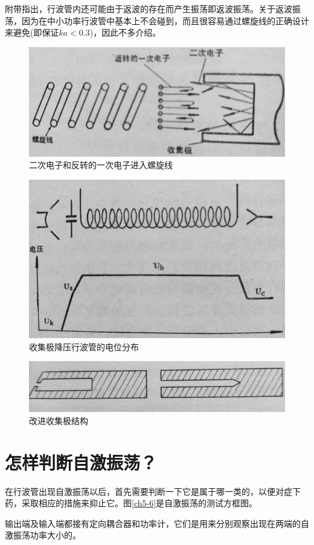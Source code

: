 附带指出，行波管内还可能由于返波的存在而产生振荡即返波振荡。关于返波振荡，因为在中小功率行波管中基本上不会碰到，而且很容易通过螺旋线的正确设计来避免(即保证$ ka < 0.3 $)，因此不多介绍。


\begin{figure}[phtb]
	\centering
	\includegraphics[width=0.65\linewidth]{figure/ch5-3}
	\caption{二次电子和反转的一次电子进入螺旋线}
	\label{ch5-3}
\end{figure}

\begin{figure}[phtb]
	\centering
	\includegraphics[width=0.62\linewidth]{figure/ch5-4}
	\caption{收集极降压行波管的电位分布}
	\label{ch5-4}
\end{figure}

\begin{figure}[phtb]
	\centering
	\includegraphics[width=0.65\linewidth]{figure/ch5-5}
	\caption{改进收集极结构}
	\label{ch5-5}
\end{figure}
\section{怎样判断自激振荡？}
在行波管出现自激振荡以后，首先需要判断一下它是属于哪一类的，以便对症下药，采取相应的措施来抑止它。图\ref{ch5-6}是自激振荡的测试方框图。


输出端及输入端都接有定向耦合器和功率计，它们是用来分别观察出现在两端的自激振荡功率大小的。


